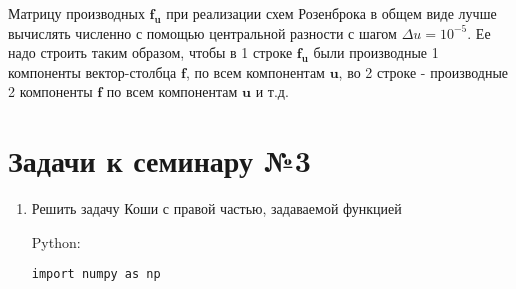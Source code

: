 Матрицу производных $\mathbf{f_u}$ при реализации схем Розенброка в общем виде лучше вычислять численно с помощью центральной разности с шагом $\Delta u = 10^{-5}$. Ее надо строить таким образом, чтобы в 1 строке $\mathbf{f_u}$ были производные 1 компоненты вектор-столбца $\mathbf{f}$, по всем компонентам $\mathbf{u}$, во 2 строке - производные 2 компоненты $\mathbf{f}$ по всем компонентам $\mathbf{u}$ и т.д.

\newpage

\section*{Задачи к семинару №3}
\begin{enumerate}
\item Решить задачу Коши с правой частью, задаваемой функцией  

Python:
\begin{verbatim}
import numpy as np


\end{verbatim}
\end{enumerate}
